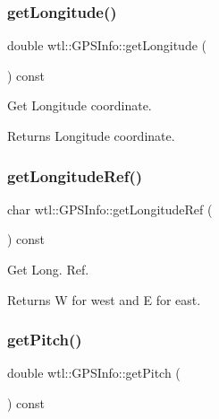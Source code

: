 \subsubsection{\texorpdfstring{get\+Longitude()}{getLongitude()}}
{\footnotesize\ttfamily double wtl\+::\+G\+P\+S\+Info\+::get\+Longitude (\begin{DoxyParamCaption}{ }\end{DoxyParamCaption}) const}



Get Longitude coordinate. 

\begin{DoxyReturn}{Returns}
Longitude coordinate. 
\end{DoxyReturn}
\mbox{\label{classwtl_1_1_g_p_s_info_a4034566abc908fc80e0299486efcb9ee}} 
\subsubsection{\texorpdfstring{get\+Longitude\+Ref()}{getLongitudeRef()}}
{\footnotesize\ttfamily char wtl\+::\+G\+P\+S\+Info\+::get\+Longitude\+Ref (\begin{DoxyParamCaption}{ }\end{DoxyParamCaption}) const}



Get Long. Ref. 

\begin{DoxyReturn}{Returns}
W for west and E for east. 
\end{DoxyReturn}
\mbox{\label{classwtl_1_1_g_p_s_info_abfd7decf737bf895bd276f1044295d7f}} 
\subsubsection{\texorpdfstring{get\+Pitch()}{getPitch()}}
{\footnotesize\ttfamily double wtl\+::\+G\+P\+S\+Info\+::get\+Pitch (\begin{DoxyParamCaption}{ }\end{DoxyParamCaption}) const}



